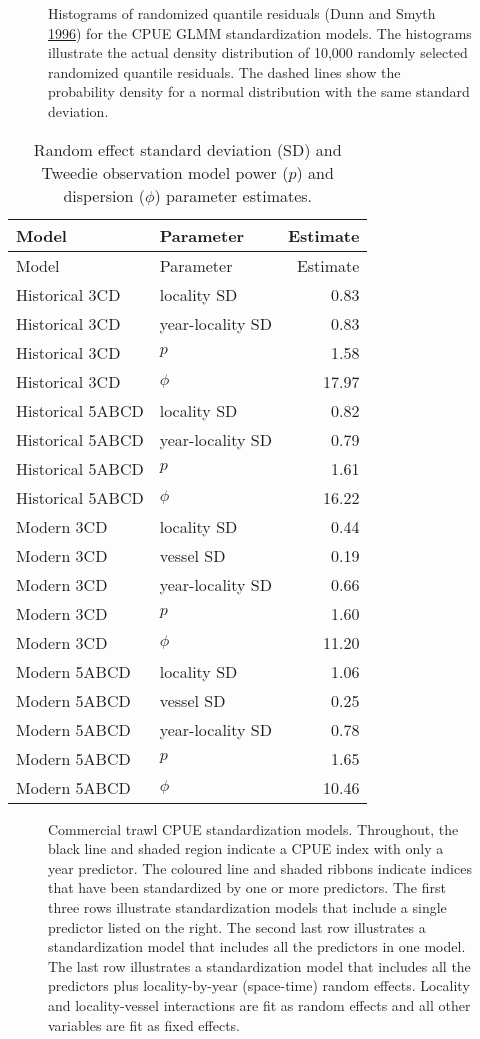 \documentclass[11pt]{book}
\begin{document}
\begin{figure}[htb]

{\centering {} 

}

\caption{Histograms of randomized quantile residuals (Dunn and Smyth \protect\hyperlink{ref-dunn1996}{1996}) for the CPUE GLMM standardization models. The histograms illustrate the actual density distribution of 10,000 randomly selected randomized quantile residuals. The dashed lines show the probability density for a normal distribution with the same standard deviation.}\label{fig:cpue-quantile-residuals}
\end{figure}
\begin{longtable}[]{@{}llr@{}}
\caption{\label{tab:cpue-pars}Random effect standard deviation (SD) and Tweedie observation model power (\(p\)) and dispersion (\(\phi\)) parameter estimates.}\tabularnewline
\toprule
Model & Parameter & Estimate\tabularnewline
\midrule
\endfirsthead
\toprule
Model & Parameter & Estimate\tabularnewline
\midrule
\endhead
Historical 3CD & locality SD & 0.83\tabularnewline
Historical 3CD & year-locality SD & 0.83\tabularnewline
Historical 3CD & \(p\) & 1.58\tabularnewline
Historical 3CD & \(\phi\) & 17.97\tabularnewline
Historical 5ABCD & locality SD & 0.82\tabularnewline
Historical 5ABCD & year-locality SD & 0.79\tabularnewline
Historical 5ABCD & \(p\) & 1.61\tabularnewline
Historical 5ABCD & \(\phi\) & 16.22\tabularnewline
Modern 3CD & locality SD & 0.44\tabularnewline
Modern 3CD & vessel SD & 0.19\tabularnewline
Modern 3CD & year-locality SD & 0.66\tabularnewline
Modern 3CD & \(p\) & 1.60\tabularnewline
Modern 3CD & \(\phi\) & 11.20\tabularnewline
Modern 5ABCD & locality SD & 1.06\tabularnewline
Modern 5ABCD & vessel SD & 0.25\tabularnewline
Modern 5ABCD & year-locality SD & 0.78\tabularnewline
Modern 5ABCD & \(p\) & 1.65\tabularnewline
Modern 5ABCD & \(\phi\) & 10.46\tabularnewline
\bottomrule
\end{longtable}
\begin{figure}[htb]

{\centering {} 

}

\caption{Commercial trawl CPUE standardization models. Throughout, the black line and shaded region indicate a CPUE index with only a year predictor. The coloured line and shaded ribbons indicate indices that have been standardized by one or more predictors. The first three rows illustrate standardization models that include a single predictor listed on the right. The second last row illustrates a standardization model that includes all the predictors in one model. The last row illustrates a standardization model that includes all the predictors plus locality-by-year (space-time) random effects. Locality and locality-vessel interactions are fit as random effects and all other variables are fit as fixed effects.}\label{fig:cpue-index-ts-hist}
\end{figure}
\end{document}
